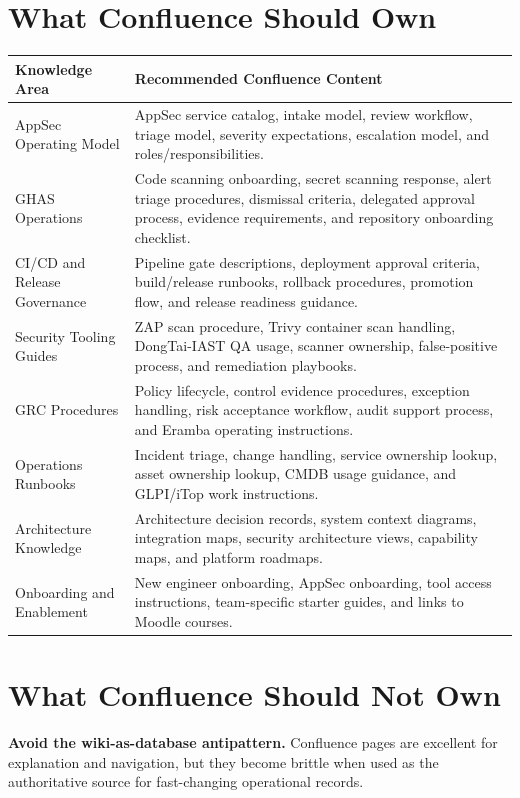 \documentclass[10pt,letterpaper]{article}
\begin{document}
\section{What Confluence Should Own}

\begin{tabularx}{\textwidth}{L{1.85in} Y}
\toprule
\textbf{Knowledge Area} & \textbf{Recommended Confluence Content} \\
\midrule
AppSec Operating Model & AppSec service catalog, intake model, review workflow, triage model, severity expectations, escalation model, and roles/responsibilities. \\
GHAS Operations & Code scanning onboarding, secret scanning response, alert triage procedures, dismissal criteria, delegated approval process, evidence requirements, and repository onboarding checklist. \\
CI/CD and Release Governance & Pipeline gate descriptions, deployment approval criteria, build/release runbooks, rollback procedures, promotion flow, and release readiness guidance. \\
Security Tooling Guides & ZAP scan procedure, Trivy container scan handling, DongTai-IAST QA usage, scanner ownership, false-positive process, and remediation playbooks. \\
GRC Procedures & Policy lifecycle, control evidence procedures, exception handling, risk acceptance workflow, audit support process, and Eramba operating instructions. \\
Operations Runbooks & Incident triage, change handling, service ownership lookup, asset ownership lookup, CMDB usage guidance, and GLPI/iTop work instructions. \\
Architecture Knowledge & Architecture decision records, system context diagrams, integration maps, security architecture views, capability maps, and platform roadmaps. \\
Onboarding and Enablement & New engineer onboarding, AppSec onboarding, tool access instructions, team-specific starter guides, and links to Moodle courses. \\
\bottomrule
\end{tabularx}

\section{What Confluence Should Not Own}

\begin{riskbox}
\textbf{Avoid the wiki-as-database antipattern.} Confluence pages are excellent for explanation and navigation, but they become brittle when used as the authoritative source for fast-changing operational records.
\end{riskbox}
\end{document}
